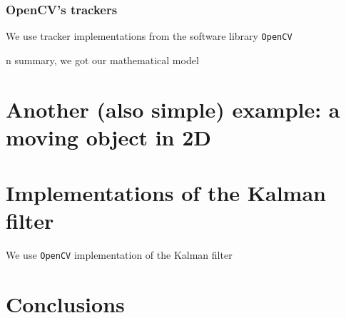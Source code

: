 \documentclass[12pt,a4paper,final]{article} %
\begin{document}
\subsubsection{OpenCV's trackers}
\label{sec:opencv_trackers}
We use tracker implementations from the software library
\texttt{OpenCV} \cite{opencv:2000:ARTICLE}


n summary, we got our mathematical model

\section{Another (also simple) example: a moving object in 2D}
\label{sec:example2D}


\section{Implementations of the Kalman filter}
We use \texttt{OpenCV} \cite{opencv:2000:ARTICLE} implementation of
the Kalman filter

\section{Conclusions}

\printbibliography[heading=bibintoc]
\end{document}
